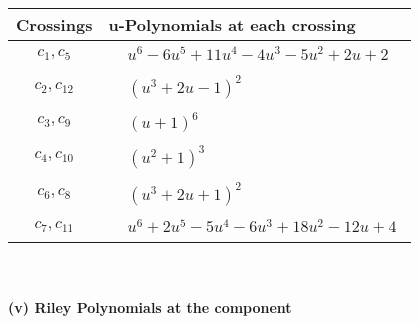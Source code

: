 \documentclass[1p]{elsarticle_modified}
\theoremstyle{definition}
\begin{document}
\begin{tabular}{m{50pt}|m{274pt}}
Crossings & \hspace{64pt}u-Polynomials at each crossing \\
\hline $$\begin{aligned}c_{1},c_{5}\end{aligned}$$&$\begin{aligned}
&u^6-6 u^5+11 u^4-4 u^3-5 u^2+2 u+2
\end{aligned}$\\
\hline $$\begin{aligned}c_{2},c_{12}\end{aligned}$$&$\begin{aligned}
&(u^3+2 u-1)^2
\end{aligned}$\\
\hline $$\begin{aligned}c_{3},c_{9}\end{aligned}$$&$\begin{aligned}
&(u+1)^6
\end{aligned}$\\
\hline $$\begin{aligned}c_{4},c_{10}\end{aligned}$$&$\begin{aligned}
&(u^2+1)^3
\end{aligned}$\\
\hline $$\begin{aligned}c_{6},c_{8}\end{aligned}$$&$\begin{aligned}
&(u^3+2 u+1)^2
\end{aligned}$\\
\hline $$\begin{aligned}c_{7},c_{11}\end{aligned}$$&$\begin{aligned}
&u^6+2 u^5-5 u^4-6 u^3+18 u^2-12 u+4
\end{aligned}$\\
\hline
\end{tabular}\\~\\
\newpage\renewcommand{\arraystretch}{1}
\flushleft \textbf{(v) Riley Polynomials at the component}\newline \\
\end{document}
